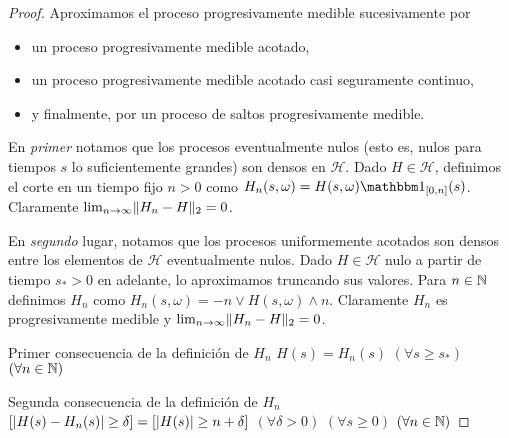 \begin{proof}
  Aproximamos el proceso progresivamente medible sucesivamente por
  \begin{itemize}
    \item un proceso progresivamente medible acotado,
    \item un proceso progresivamente medible acotado casi seguramente continuo,
    \item y finalmente, por un proceso de saltos progresivamente medible.
  \end{itemize}
  
  En \emph{primer} notamos que los procesos eventualmente nulos (esto es, nulos para tiempos \(s\) lo suficientemente grandes) son densos en \(\mathcal{H}\).
  Dado \(H \in \mathcal{H}\), definimos el corte en un tiempo fijo \(n > 0\) como \(H_n(s, \omega) = H(s, \omega) \characteristic_{[0, n]}(s)\).
  Claramente \(\lim_{n \rightarrow \infty} \lVert H_n - H\rVert_2 = 0\).

  En \emph{segundo} lugar, notamos que los procesos uniformemente acotados son densos entre los elementos de \(\mathcal{H}\) eventualmente nulos.
  Dado \(H \in \mathcal{H}\) nulo a partir de tiempo \(s_* > 0\) en adelante, lo aproximamos truncando sus valores.
  Para \(n \in \mathbb{N}\) definimos \(H_n\) como \(H_n(s, \omega) = -n \vee H(s, \omega) \wedge n\).
  Claramente \(H_n\) es progresivamente medible y \(\lim_{n \rightarrow \infty} \lVert H_n - H\rVert_2 = 0\).


  Primer consecuencia de la definición de \(H_n\) 
  \(H(s) = H_n(s)\) \((\forall s \geq s_*)\) \((\forall n \in \mathbb{N})\)

  Segunda consecuencia de la definición de \(H_n\) 
  \([\lvert H(s) - H_n(s)\rvert \geq \delta] = [\lvert H(s)\rvert \geq n + \delta]\) \((\forall \delta > 0)\) \((\forall s \geq 0)\) \((\forall n \in \mathbb{N})\)


\end{proof}
